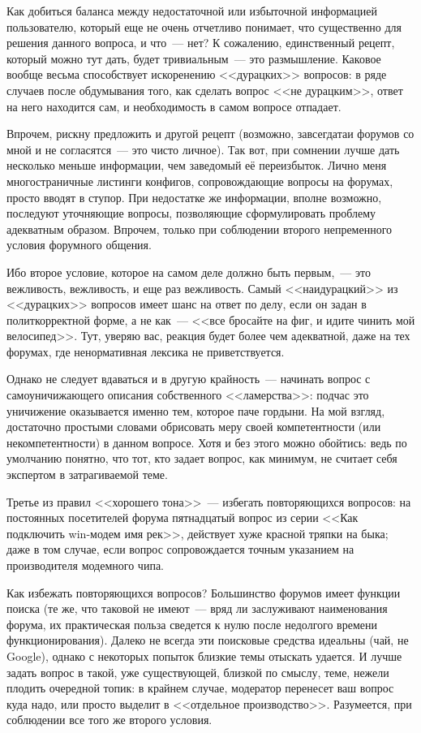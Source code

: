 Как добиться баланса между недостаточной или избыточной информацией пользователю, который еще не очень отчетливо понимает, что существенно для решения данного вопроса, и что~--- нет? К сожалению, единственный рецепт, который можно тут дать, будет тривиальным~--- это размышление. Каковое вообще весьма способствует искоренению <<дурацких>> вопросов: в ряде случаев после обдумывания того, как сделать вопрос <<не дурацким>>, ответ на него находится сам, и необходимость в самом вопросе отпадает.

Впрочем, рискну предложить и другой рецепт (возможно, завсегдатаи форумов со мной и не согласятся~--- это чисто личное). Так вот, при сомнении лучше дать несколько меньше информации, чем заведомый её переизбыток. Лично меня многостраничные листинги конфигов, сопровождающие вопросы на форумах, просто вводят в ступор. При недостатке же информации, вполне возможно, последуют уточняющие вопросы, позволяющие сформулировать проблему адекватным образом. Впрочем, только при соблюдении второго непременного условия форумного общения.

Ибо второе условие, которое на самом деле должно быть первым,~--- это вежливость, вежливость, и еще раз вежливость. Самый <<наидурацкий>> из <<дурацких>> вопросов имеет шанс на ответ по делу, если он задан в политкорректной форме, а не как~--- <<все бросайте на фиг, и идите чинить мой велосипед>>. Тут, уверяю вас, реакция будет более чем адекватной, даже на тех форумах, где ненормативная лексика не приветствуется.

Однако не следует вдаваться и в другую крайность~--- начинать вопрос с самоуничижающего описания собственного <<ламерства>>: подчас это уничижение оказывается именно тем, которое паче гордыни. На мой взгляд, достаточно простыми словами обрисовать меру своей компетентности (или некомпетентности) в данном вопросе. Хотя и без этого можно обойтись: ведь по умолчанию понятно, что тот, кто задает вопрос, как минимум, не считает себя экспертом в затрагиваемой теме.

Третье из правил <<хорошего тона>>~--- избегать повторяющихся вопросов: на постоянных посетителей форума пятнадцатый вопрос из серии <<Как подключить win-модем имя рек>>, действует хуже красной тряпки на быка; даже в том случае, если вопрос сопровождается точным указанием на производителя модемного чипа.

Как избежать повторяющихся вопросов? Большинство форумов имеет функции поиска (те же, что таковой не имеют~--- вряд ли заслуживают наименования форума, их практическая польза сведется к нулю после недолгого времени функционирования). Далеко не всегда эти поисковые средства идеальны (чай, не Google), однако с некоторых попыток близкие темы отыскать удается. И лучше задать вопрос в такой, уже существующей, близкой по смыслу, теме, нежели плодить очередной топик: в крайнем случае, модератор перенесет ваш вопрос куда надо, или просто выделит в <<отдельное производство>>. Разумеется, при соблюдении все того же второго условия.

